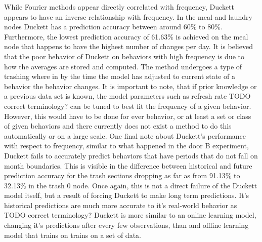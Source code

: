 While Fourier methods appear directly correlated with frequency, Duckett
appears to have an inverse relationship with frequency. In the meal and
laundry nodes Duckett has a prediction accuracy between around 60\% to 80\%.
Furthermore, the lowest prediction accuracy of 61.63\% is achieved on the meal
node that happens to have the highest number of changes per day. It is believed
that the poor behavior of Duckett on behaviors with high frequency is due to
how the averages are stored and computed. The method undergoes a type of
trashing where in by the time the model has adjusted to current state of a
behavior the behavior changes. It is important to note, that if prior knowledge
or a previous data set is known, the model parameters such as refresh rate TODO
correct terminology? can be tuned to best fit the frequency of a given behavior.
However, this would have to be done for ever behavior, or at least a set or class
of given behaviors and there currently does not exist a method to do this
automatically or on a large scale. One final note about Duckett's performance
with respect to frequency, similar to what happened in the door B experiment,
Duckett fails to accurately predict behaviors that have periods that do not
fall on month boundaries. This is visible in the difference between historical
and future prediction accuracy for the trash sections dropping as far as from
91.13\% to 32.13\% in the trash 0 node. Once again, this is not a direct failure
of the Duckett model itself, but a result of forcing Duckett to make long
term predictions. It's historical predictions are much more accurate to it's
real-world behavior as TODO correct terminology? Duckett is more similar to
an online learning model, changing it's predictions after every few observations,
than and offline learning model that trains on trains on a set of data. \\




\begin{table}[htb!]
  \centering
  \caption{Hallway Delivery Section}
\end{table}

